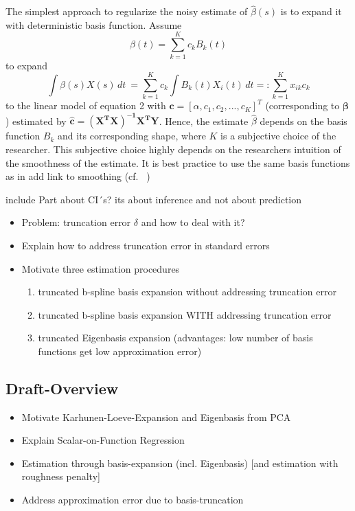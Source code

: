 \documentclass[11pt,twoside,a4paper]{article}
\begin{document}
	
The simplest approach to regularize the noisy estimate of $\hat{\beta}(s)$	is to expand it with deterministic basis function. Assume 
	\begin{equation}
     \beta(t) =  \sum_{k=1}^{K} c_{k}B_{k}(t)
    \end{equation}
    to expand
    \begin{equation}
    \int \beta(s)X(s) \,dt \ = \sum_{k=1}^{K} c_{k} \int B_{k}(t)X_{i}(t)\,dt =: \sum_{k=1}^{K} x_{ik} c_{k} 
    \end{equation}
    to the linear model of equation 2 with $\mathbf{c} = [\alpha, c_1, c_2,...,c_K]^T$ (corresponding to $\mathbf{\beta}$) estimated by $\mathbf{\hat{c}} = \mathbf{(X^{T}X)^{-1}X^{T}Y}$. Hence, the estimate $\hat{\beta}$ depends on the basis function $B_{k}$ and its corresponding shape, where $K$ is a subjective choice of the researcher. This subjective choice highly depends on the researchers intuition of the smoothness of the estimate. It is best practice to use the same basis functions as in {\color{red} add link to smoothing} (cf. ~\cite{kokoszka_introduction_2017})
    
    {\color{red} include Part about CI´s? its about inference and not about prediction}
    
	

	\begin{itemize}
		\item Problem: truncation error $\delta$ and how to deal with it?
	\end{itemize}

	\begin{itemize}	
		\item Explain how to address truncation error in standard errors
		\item Motivate three estimation procedures
		\begin{enumerate}
			\item truncated b-spline basis expansion without addressing truncation error
			\item truncated b-spline basis expansion WITH addressing truncation error
			\item truncated Eigenbasis expansion (advantages: low number of basis functions get low approximation error)
		\end{enumerate}
	\end{itemize}
	
	\subsection{Draft-Overview}
	\begin{itemize}
		\item Motivate Karhunen-Loeve-Expansion and Eigenbasis from PCA		
		\item Explain Scalar-on-Function Regression
		\item Estimation through basis-expansion (incl. Eigenbasis) [and estimation with roughness penalty]
		\item Address approximation error due to basis-truncation
	\end{itemize}
\end{document}
